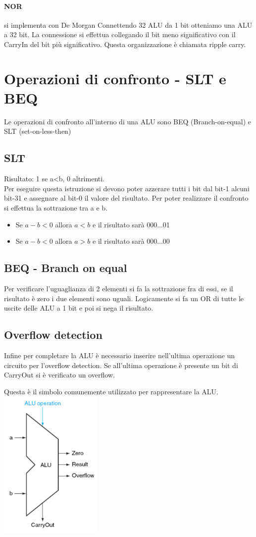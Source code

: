 \documentclass[12pt, a4paper, openany]{book}
\begin{document}
\paragraph{NOR} si implementa con De Morgan
Connettendo 32 ALU da 1 bit otteniamo una ALU a 32 bit. La connessione si effettua collegando
il bit meno significativo con il CarryIn del bit più significativo. Questa organizzazione è
chiamata ripple carry.
\section{Operazioni di confronto - SLT e BEQ}
Le operazioni di confronto all'interno di una ALU sono BEQ (Branch-on-equal)
e SLT (set-on-less-then)
\subsection{SLT}
Risultato: 1 se a<b, 0 altrimenti.
\\ Per eseguire questa istruzione si devono poter azzerare tutti i bit dal bit-1 alcuni
bit-31 e assegnare al bit-0 il valore del risultato.
Per poter realizzare il confronto si effettua la sottrazione tra a e b.
\begin{itemize}
    \item Se $a-b < 0$ allora $a<b$ e il risultato sarà 000...01
    \item Se $a-b < 0$ allora $a>b$ e il risultato sarà 000...00
\end{itemize}
\subsection{BEQ - Branch on equal}
Per verificare l'uguaglianza di 2 elementi si fa la sottrazione fra di essi, se il risultato
è zero i due elementi sono uguali. Logicamente si fa un OR di tutte le uscite delle ALU a 1 bit
e poi si nega il risultato.
\subsection{Overflow detection}
Infine per completare la ALU è necessario inserire nell'ultima operazione un circuito
per l'overflow detection. Se all'ultima operazione è presente un bit di CarryOut si è verificato
un overflow.
\begin{center}
    Questa è il simbolo comunemente utilizzato per rappresentare la ALU. 
    \includegraphics[width=50mm, scale=0.5]{alu_symbol.png}
\end{center}
\end{document}
